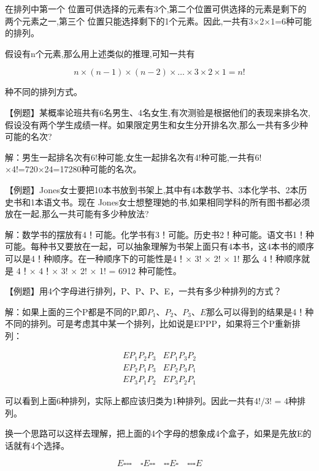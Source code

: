 在排列中第一个
位置可供选择的元素有3个,第二个位置可供选择的元素是剩下的两个元素之一,第三个
位置只能选择剩下的1个元素。因此,一共有3×2×1=6种可能的排列。

假设有n个元素,那么用上述类似的推理,可知一共有

\[
n×(n-1)×(n-2)×…×3×2×1=n!
\]


种不同的排列方式。\par\vspace{\baselineskip}


【例题】某概率论班共有6名男生、4名女生,有次测验是根据他们的表现来排名次,假设没有两个学生成绩一样。如果限定男生和女生分开排名次,那么一共有多少种可能的名次?

解：男生一起排名次有6!种可能,女生一起排名次有4!种可能,一共有6!×4!=720×24=17280种可能的名次。\par\vspace{\baselineskip}

【例题】Jones女士要把10本书放到书架上,其中有4本数学书、3本化学书、2本历史书和1本语文书。现在 Jones女士想整理她的书,如果相同学科的所有图书都必须放在一起,那么一共可能有多少种放法?

解：数学书的摆放有4！可能。化学书有3！可能。历史书2！种可能。语文书1！种可能。每种书又要放在一起，可以抽象理解为书架上面只有4本书，这4本书的顺序可以是4！种顺序。在一种顺序下的可能性是4！× 3! × 2! × 1! 那么 4！种顺序就是 4！× 4！× 3! × 2! × 1! = 6912 种可能性。\par\vspace{\baselineskip}

【例题】用4个字母进行排列，P、P、P、E，一共有多少种排列的方式？

解：如果上面的三个P都是不同的P,即$P_{1} 、P_{2}、P_{3}、E$那么可以得到的结果是4！种不同的排列。可是考虑其中某一个排列，比如说是EPPP，如果将三个P重新排列：

$$
\begin{array}{cccc}
EP_{1}P_{2}P_{3} &EP_{1}P_{3}P_{2} \\
EP_{2}P_{1}P_{3}  &EP_{2}P_{3}P_{1}  \\
EP_{3}P_{1}P_{2}  &EP_{3}P_{2}P_{1} 
\end{array}
$$


可以看到上面6种排列，实际上都应该归类为1种排列。因此一共有4!/3! = 4种排列。

换一个思路可以这样去理解，把上面的4个字母的想象成4个盒子，如果是先放E的话就有4个选择。

$$
E\square\square\square \hspace{1em} 
\square E\square\square \hspace{1em} 
\square\square E\square \hspace{1em} 
\square\square\square E
$$


